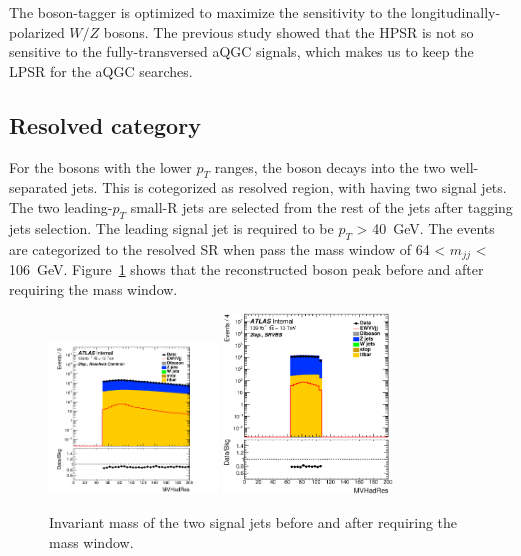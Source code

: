 The boson-tagger is optimized to maximize the sensitivity to the longitudinally-polarized $W/Z$ bosons. 
The previous study showed that the HPSR is not so sensitive to the fully-transversed aQGC signals, which makes us to keep the LPSR for the aQGC searches. 

\subsection{Resolved category}
For the bosons with the lower $p_T$ ranges, the boson decays into the two well-separated jets. This is cotegorized as resolved region, with having two signal jets. The two leading-$p_T$ small-R jets are selected from the rest of the jets after tagging jets selection. The leading signal jet is required to be $p_T$ > 40~GeV. 
The events are categorized to the resolved SR when pass the mass window of 64 < $m_{jj}$ < 106~GeV. Figure~\ref{fig:MVHadResSR} shows that the reconstructed boson peak before and after requiring the mass window.
\begin{figure}[H]
    \centering
    \includegraphics[width=0.4\textwidth]{figures/2lep/dataMC/C_0ptag2pjet_0ptv_ResolvedCommon_MVHadRes_Log}
    \includegraphics[width=0.4\textwidth]{figures/2lep/dataMC/C_0ptag2pjet_0ptv_SRVBS_MVHadRes_Log}
    \caption{Invariant mass of the two signal jets before and after requiring the mass window. 
    }
    \label{fig:MVHadResSR}
\end{figure}

